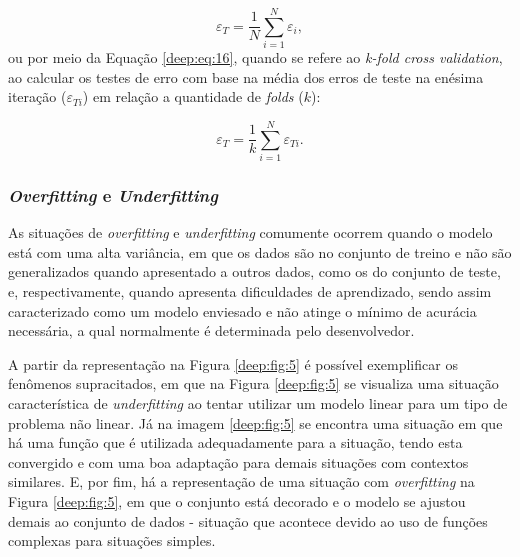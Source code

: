 \begin{equation}
    \label{deep:eq:15}
    \varepsilon_T = \frac{1}{N} \sum_{i=1}^{N} \varepsilon_i,
\end{equation}
ou por meio da Equação \ref{deep:eq:16}, quando se refere ao \textit{k-fold cross validation}, ao calcular os testes de erro com base na média dos erros de teste na enésima iteração ($\varepsilon_{Ti}$) em relação a quantidade de \textit{folds} ($k$):

\begin{equation}
    \label{deep:eq:16}
    \varepsilon_T = \frac{1}{k} \sum_{i=1}^{N} \varepsilon_{Ti}.
\end{equation}

\subsubsection{\textit{Overfitting} e \textit{Underfitting}}
\label{deep:overunder}

As situações de \textit{overfitting} e \textit{underfitting} comumente ocorrem quando o modelo está com uma alta variância, em que os dados são  no conjunto de treino e não são generalizados quando apresentado a outros dados, como os do conjunto de teste, e, respectivamente, quando apresenta dificuldades de aprendizado, sendo assim caracterizado como um modelo enviesado e não atinge o mínimo de acurácia necessária, a qual normalmente é determinada pelo desenvolvedor.

A partir da representação na Figura \ref{deep:fig:5} é possível exemplificar os fenômenos supracitados, em que na Figura \ref{deep:fig:5} se visualiza uma situação característica de \textit{underfitting} ao tentar utilizar um modelo linear para um tipo de problema não linear. Já na imagem \ref{deep:fig:5} se encontra uma situação em que há uma função que é utilizada adequadamente para a situação, tendo esta convergido e com uma boa adaptação para demais situações com contextos similares. E, por fim, há a representação de uma situação com \textit{overfitting} na Figura \ref{deep:fig:5}, em que o conjunto está decorado e o modelo se ajustou demais ao conjunto de dados - situação que acontece devido ao uso de funções complexas para situações simples.

